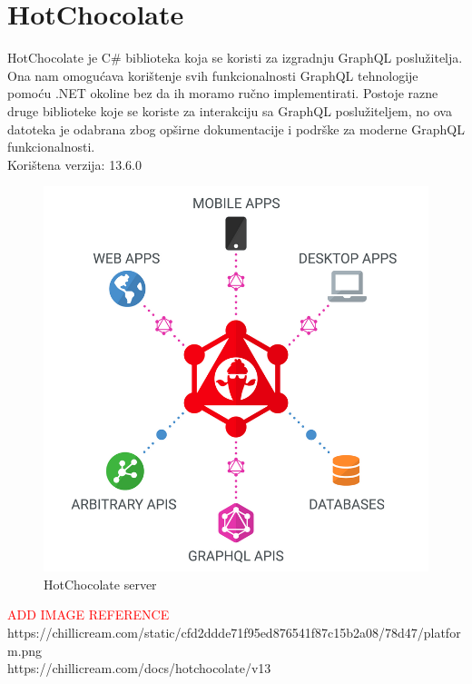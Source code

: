 \documentclass[zavrsnirad]{fer}
\begin{document}
\section{HotChocolate}
\label{pog:hotchocolate}
HotChocolate je C\# biblioteka koja se koristi za izgradnju GraphQL poslužitelja. Ona nam omogućava korištenje svih funkcionalnosti GraphQL tehnologije pomoću .NET okoline bez da ih moramo ručno implementirati. Postoje razne druge biblioteke koje se koriste za interakciju sa GraphQL poslužiteljem, no ova datoteka je odabrana zbog opširne dokumentacije i podrške za moderne GraphQL funkcionalnosti.\\Korištena verzija: 13.6.0
\begin{figure}[htb]
	\centering
	\includegraphics[width=0.6\linewidth]{images/hot_chocolate.png} 
	\caption{HotChocolate server}
	\label{slk:hot_chooclate}
\end{figure}
\FloatBarrier
\textcolor{red}{ADD IMAGE REFERENCE} https://chillicream.com/static/cfd2ddde71f95ed876541f87c15b2a08/78d47/platform.png\\https://chillicream.com/docs/hotchocolate/v13
\end{document}
